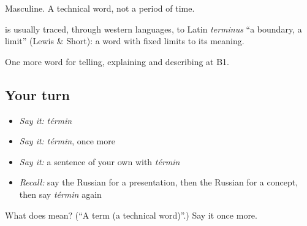 Masculine. A technical word, not a period of time.

\begin{cousinweb}
\textbf{} is usually traced, through western languages, to Latin \emph{terminus} \textquotedblleft{}a boundary, a limit\textquotedblright{} (Lewis \& Short): a word with fixed limits to its meaning.
\end{cousinweb}

\begin{grammarlens}[title={What you've built}]
One more word for telling, explaining and describing at B1.
\end{grammarlens}

\subsection*{Your turn}
\begin{itemize}
\raggedright
  \item \emph{Say it:} \emph{términ}
  \item \emph{Say it:} \emph{términ}, once more
  \item \emph{Say it:} a sentence of your own with \emph{términ}
  \item \emph{Recall:} say the Russian for a presentation, then the Russian for a concept, then say \emph{términ} again
\end{itemize}

\begin{tcolorbox}[breakable,colback=teal!4,colframe=teal!35!black,title={Before you move on}]
What does  mean? (\textquotedblleft{}A term (a technical word)\textquotedblright{}.) Say it once more.
\end{tcolorbox}
